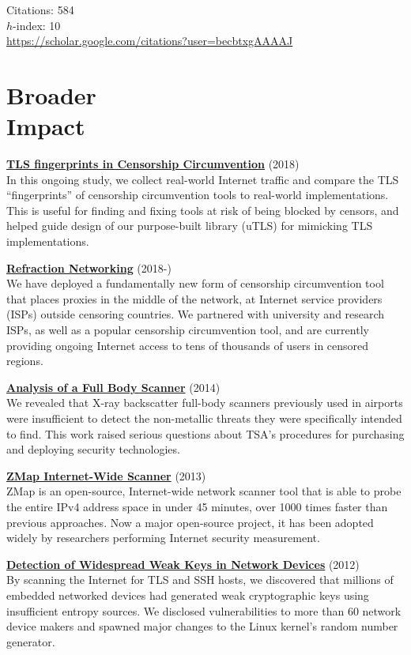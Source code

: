 \documentclass[margin,11pt]{res} %
\begin{document}
Citations: 584\\
$h$-index: 10\\
\url{https://scholar.google.com/citations?user=becbtxgAAAAJ}
\fi



\vspace{6pt}
\section{\large Broader\\Impact}

\textbf{\href{https://tlsfingerprint.io}{TLS fingerprints in Censorship Circumvention}} (2018) \\
In this ongoing study, we collect real-world Internet traffic and compare the TLS ``fingerprints'' of censorship circumvention tools to real-world implementations. This is useful for finding and fixing tools at risk of being blocked by censors, and helped guide design of our purpose-built library (uTLS) for mimicking TLS implementations.

\textbf{\href{https://refraction.network}{Refraction Networking}} (2018-) \\
We have deployed a fundamentally new form of censorship circumvention tool that places proxies in the middle of the network, at Internet service providers (ISPs) outside censoring countries. We partnered with university and research ISPs, as well as a popular censorship circumvention tool, and are currently providing ongoing Internet access to tens of thousands of users in censored regions.

\textbf{\href{https://radsec.org}{Analysis of a Full Body Scanner}} (2014)\\
We revealed that X-ray backscatter full-body scanners previously used in airports were insufficient to detect the non-metallic threats they were specifically intended to find. This work raised serious questions about TSA's procedures for purchasing and deploying security technologies.

\textbf{\href{https://zmap.io/}{ZMap Internet-Wide Scanner}} (2013)\\
ZMap is an open-source, Internet-wide network scanner tool that is able to probe the entire IPv4 address space in under 45 minutes, over 1000 times faster than previous approaches. Now a major open-source project, it has been adopted widely by researchers performing Internet security measurement.

\textbf{\href{https://factorable.net/}{Detection of Widespread Weak Keys in Network Devices}} (2012)\\
By scanning the Internet for TLS and SSH hosts, we discovered that millions of embedded networked devices had generated weak cryptographic keys using insufficient entropy sources. We disclosed vulnerabilities to more than 60 network device makers and spawned major changes to the Linux kernel's random number generator.
\end{document}
